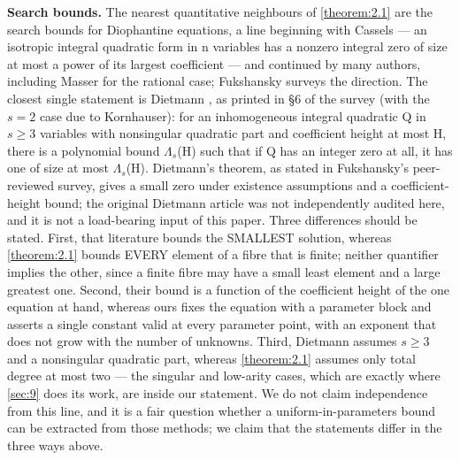 \textbf{Search bounds.} The nearest quantitative neighbours of \cref{theorem:2.1} are the search bounds for Diophantine equations, a line beginning with Cassels \cite{Cas55} — an isotropic integral quadratic form in n variables has a nonzero integral zero of size at most a power of its largest coefficient — and continued by many authors, including Masser \cite{Mas98} for the rational case; Fukshansky \cite{Fuk13} surveys the direction. The closest single statement is Dietmann \cite{Die03}, as printed in §6 of the survey \cite{Fuk13} (with the $s = 2$ case due to Kornhauser): for an inhomogeneous integral quadratic Q in $s ≥ 3$ variables with nonsingular quadratic part and coefficient height at most H, there is a polynomial bound $Λ_{s}$(H) such that if Q has an integer zero at all, it has one of size at most $Λ_{s}$(H). Dietmann's theorem, as stated in Fukshansky's peer-reviewed survey, gives a small zero under existence assumptions and a coefficient-height bound; the original Dietmann article was not independently audited here, and it is not a load-bearing input of this paper. Three differences should be stated. First, that literature bounds the SMALLEST solution, whereas \cref{theorem:2.1} bounds EVERY element of a fibre that is finite; neither quantifier implies the other, since a finite fibre may have a small least element and a large greatest one. Second, their bound is a function of the coefficient height of the one equation at hand, whereas ours fixes the equation with a parameter block and asserts a single constant valid at every parameter point, with an exponent that does not grow with the number of unknowns. Third, Dietmann assumes $s ≥ 3$ and a nonsingular quadratic part, whereas \cref{theorem:2.1} assumes only total degree at most two — the singular and low-arity cases, which are exactly where \cref{sec:9} does its work, are inside our statement. We do not claim independence from this line, and it is a fair question whether a uniform-in-parameters bound can be extracted from those methods; we claim that the statements differ in the three ways above.

